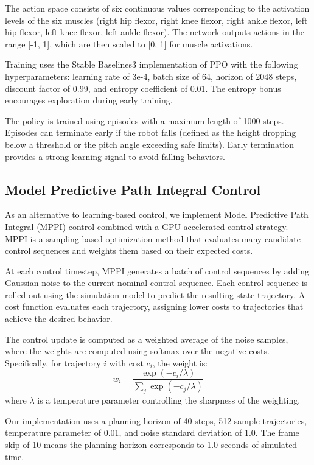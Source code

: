 \documentclass[conference]{IEEEtran}
\begin{document}
The action space consists of six continuous values corresponding to the activation levels of the six muscles (right hip flexor, right knee flexor, right ankle flexor, left hip flexor, left knee flexor, left ankle flexor). The network outputs actions in the range [-1, 1], which are then scaled to [0, 1] for muscle activations.

Training uses the Stable Baselines3 implementation of PPO with the following hyperparameters: learning rate of 3e-4, batch size of 64, horizon of 2048 steps, discount factor of 0.99, and entropy coefficient of 0.01. The entropy bonus encourages exploration during early training.

The policy is trained using episodes with a maximum length of 1000 steps. Episodes can terminate early if the robot falls (defined as the height dropping below a threshold or the pitch angle exceeding safe limits). Early termination provides a strong learning signal to avoid falling behaviors.

\subsection{Model Predictive Path Integral Control}

As an alternative to learning-based control, we implement Model Predictive Path Integral (MPPI) control combined with a GPU-accelerated control strategy. MPPI is a sampling-based optimization method that evaluates many candidate control sequences and weights them based on their expected costs.

At each control timestep, MPPI generates a batch of control sequences by adding Gaussian noise to the current nominal control sequence. Each control sequence is rolled out using the simulation model to predict the resulting state trajectory. A cost function evaluates each trajectory, assigning lower costs to trajectories that achieve the desired behavior.

The control update is computed as a weighted average of the noise samples, where the weights are computed using softmax over the negative costs. Specifically, for trajectory $i$ with cost $c_i$, the weight is:
\begin{equation}
w_i = \frac{\exp(-c_i / \lambda)}{\sum_j \exp(-c_j / \lambda)}
\end{equation}
where $\lambda$ is a temperature parameter controlling the sharpness of the weighting.

Our implementation uses a planning horizon of 40 steps, 512 sample trajectories, temperature parameter of 0.01, and noise standard deviation of 1.0. The frame skip of 10 means the planning horizon corresponds to 1.0 seconds of simulated time.
\end{document}
